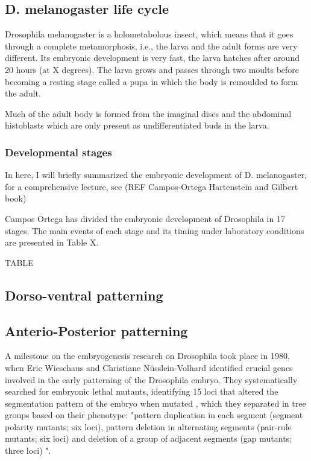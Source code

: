 \subsection{D. melanogaster life cycle}

Drosophila melanogaster is a holometabolous insect, which means that it goes through a complete metamorphosis, i.e., the larva and the adult forms are very different.
Its embryonic development is very fast, the larva hatches after around 20 hours (at  X degrees).
The larva grows and passes through two moults before becoming a resting stage called a pupa in which
the body is remoulded to form the adult. 

Much of the adult body is formed
from the imaginal discs and the abdominal histoblasts which are only present
as undifferentiated buds in the larva.

\subsubsection{Developmental stages}

In here, I will briefly summarized the embryonic development of D. melanogaster, for a comprehensive lecture, see (REF Campos-Ortega Hartenstein and Gilbert book)

Campos Ortega has divided the embryonic development of Drosophila in 17 stages. The main events of each stage and its timing under laboratory conditions are presented in Table X.

TABLE


\subsection{Dorso-ventral patterning}

\subsection{Anterio-Posterior patterning}

A milestone on the embryogenesis research on Drosophila took place in 1980, when Eric Wieschaus and Christiane N\"{u}sslein-Volhard identified crucial genes involved in the early patterning of the Drosophila embryo.
They systematically searched for embryonic lethal mutants, identifying 15 loci that altered the segmentation pattern of the embryo when mutated \citep{Nusslein-Volhard1980}, which they separated in tree groups based on their phenotype: "pattern duplication in each
segment (segment polarity mutants; six loci), pattern deletion in
alternating segments (pair-rule mutants; six loci) and deletion of
a group of adjacent segments (gap mutants; three loci) \citep{Nusslein-Volhard1980}".

